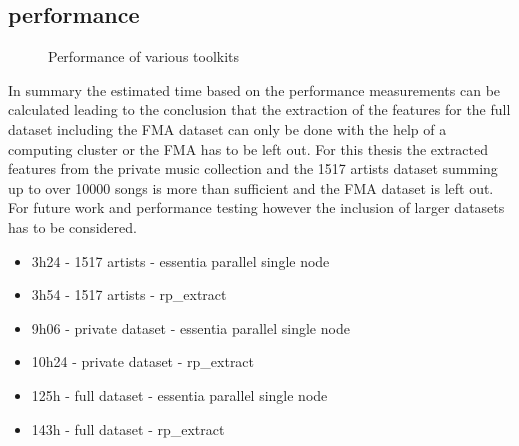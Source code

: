 \subsection{performance}
\begin{figure}[htbp]
	\centering
	\caption{Performance of various toolkits}
	\label{perfex}
\end{figure}

In summary the estimated time based on the performance measurements can be calculated leading to the conclusion that the extraction of the features for the full dataset including the FMA dataset can only be done with the help of a computing cluster or the FMA has to be left out. For this thesis the extracted features from the private music collection and the 1517 artists dataset summing up to over 10000 songs is more than sufficient and the FMA dataset is left out. For future work and performance testing however the inclusion of larger datasets has to be considered. 

\begin{itemize}
	\item 3h24 - 1517 artists - essentia parallel single node
	\item 3h54 - 1517 artists - rp\_extract
	\item 9h06 - private dataset - essentia parallel single node
	\item 10h24 - private dataset - rp\_extract
	\item 125h - full dataset - essentia parallel single node
	\item 143h - full dataset - rp\_extract
\end{itemize}
